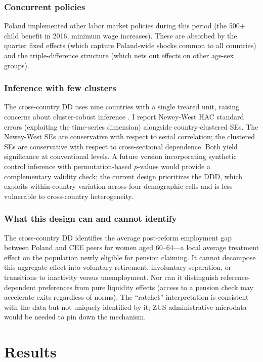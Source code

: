 \documentclass[12pt]{article}
\begin{document}
\subsubsection*{Concurrent policies} Poland implemented other labor market policies during this period (the 500+ child benefit in 2016, minimum wage increases). These are absorbed by the quarter fixed effects (which capture Poland-wide shocks common to all countries) and the triple-difference structure (which nets out effects on other age-sex groups).

\subsubsection*{Inference with few clusters} The cross-country DD uses nine countries with a single treated unit, raising concerns about cluster-robust inference \citep{callaway2021difference}. I report Newey-West HAC standard errors (exploiting the time-series dimension) alongside country-clustered SEs. The Newey-West SEs are conservative with respect to serial correlation; the clustered SEs are conservative with respect to cross-sectional dependence. Both yield significance at conventional levels. A future version incorporating synthetic control inference \citep{abadie2010synthetic} with permutation-based $p$-values would provide a complementary validity check; the current design prioritizes the DDD, which exploits within-country variation across four demographic cells and is less vulnerable to cross-country heterogeneity.

\subsubsection*{What this design can and cannot identify} The cross-country DD identifies the average post-reform employment gap between Poland and CEE peers for women aged 60--64---a local average treatment effect on the population newly eligible for pension claiming. It cannot decompose this aggregate effect into voluntary retirement, involuntary separation, or transitions to inactivity versus unemployment. Nor can it distinguish reference-dependent preferences from pure liquidity effects (access to a pension check may accelerate exits regardless of norms). The ``ratchet'' interpretation is consistent with the data but not uniquely identified by it; ZUS administrative microdata would be needed to pin down the mechanism.


\section{Results}
\end{document}
